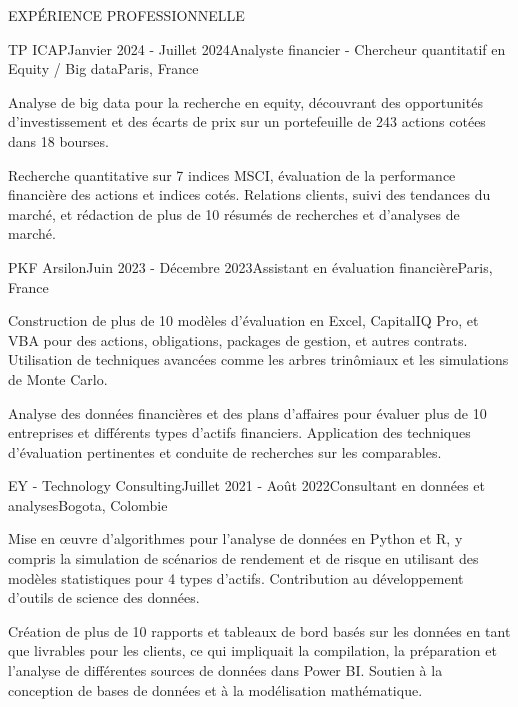 \documentclass{resume} %
\begin{document}
\begin{rSection}{EXPÉRIENCE PROFESSIONNELLE}

    \vspace{0.3em}
    \begin{rSubsection}{TP ICAP}{Janvier 2024 - Juillet 2024}{Analyste financier - Chercheur quantitatif en Equity / Big data}{Paris, France}
        \item Analyse de big data pour la recherche en equity, découvrant des opportunités d'investissement et des écarts de prix sur un portefeuille de 243 actions cotées dans 18 bourses.
        \item Recherche quantitative sur 7 indices MSCI, évaluation de la performance financière des actions et indices cotés. Relations clients, suivi des tendances du marché, et rédaction de plus de 10 résumés de recherches et d'analyses de marché.
    \end{rSubsection}
    
    \begin{rSubsection}{PKF Arsilon}{Juin 2023 - Décembre 2023}{Assistant en évaluation financière}{Paris, France}
        \item Construction de plus de 10 modèles d'évaluation en Excel, CapitalIQ Pro, et VBA pour des actions, obligations, packages de gestion, et autres contrats. Utilisation de techniques avancées comme les arbres trinômiaux et les simulations de Monte Carlo.
        \item Analyse des données financières et des plans d'affaires pour évaluer plus de 10 entreprises et différents types d'actifs financiers. Application des techniques d'évaluation pertinentes et conduite de recherches sur les comparables.
    \end{rSubsection}
    
    \begin{rSubsection}{EY - Technology Consulting}{Juillet 2021 - Août 2022}{Consultant en données et analyses}{Bogota, Colombie}
        \item Mise en œuvre d'algorithmes pour l'analyse de données en Python et R, y compris la simulation de scénarios de rendement et de risque en utilisant des modèles statistiques pour 4 types d'actifs. Contribution au développement d'outils de science des données.
        \item Création de plus de 10 rapports et tableaux de bord basés sur les données en tant que livrables pour les clients, ce qui impliquait la compilation, la préparation et l'analyse de différentes sources de données dans Power BI. Soutien à la conception de bases de données et à la modélisation mathématique.
    \end{rSubsection}
    \end{rSection}
    
\end{document}
